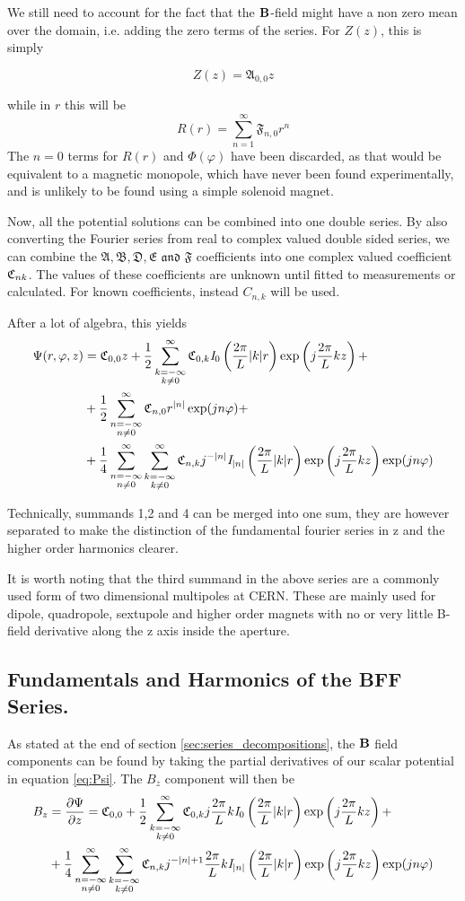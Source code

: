 We still need to account for the fact that the $\vb{B}$-field might have
a non zero mean over the domain, i.e. adding the zero terms of the series.
For $Z(z)$, this is simply

\begin{equation}
    Z(z) = \mathfrak{A}_{0,0}z
\end{equation}

while in $r$ this will be
\begin{equation}
    R(r) = \sum\limits_{n=1}^{\infty} \mathfrak{F}_{n,0}r^n
\end{equation}
\cite[pp.12-14]{moon_field_1988}
The $n=0$ terms for $R(r)$ and $\varPhi(\varphi)$ have been discarded,
as that would be equivalent to a magnetic monopole, which have never
been found experimentally, and is unlikely to be found using a simple
solenoid magnet.\cite{Acharya2022}

Now, all the potential solutions can be combined into one double
series. By also converting the Fourier series from real to complex
valued double sided series, we can combine the
$\mathfrak{A, B, D, E \text{ and } F}$
coefficients into one complex valued coefficient $\Cnk$. The values
of these coefficients are unknown until fitted to measurements or 
calculated. For known coefficients, instead $C_{n,k}$ will be used.

After a lot of algebra, this yields
\begin{equation} \label{eq:Psi}
    \begin{split}
        \Psi(r,\varphi,z) &=\Cnk[0,0]z + \Bffok +\\
        &+ \Bffno +\\ &+ \Bffnk
    \end{split}
\end{equation}

Technically, summands 1,2 and 4 can be merged into one sum,
they are however separated to make the distinction of the
fundamental fourier series in z and the higher order
harmonics clearer.

It is worth noting that the third summand in the above series
are a commonly used form of two dimensional multipoles at CERN.
These are mainly used for dipole, quadropole, sextupole and
higher order magnets with no or very little B-field
derivative along the z axis inside the aperture.
\cite[Ch.6.1]{russenschuck_field_2011}

\subsection{Fundamentals and Harmonics of the BFF Series.}
As stated at the end of section \ref{sec:series_decompositions},
the $\vb{B}$ field components can be found by taking
the partial derivatives of our scalar potential in
equation \ref{eq:Psi}.
The $B_z$ component will then be
\begin{equation}
    \begin{split}
        B_z &= \frac{\partial \Psi}{\partial z} =
        \Cnk[0,0] + \Bffzok +\\
        &+ \Bffznk
    \end{split}
\end{equation}

